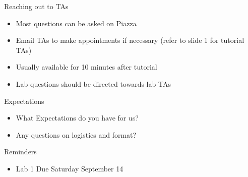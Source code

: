 \begin{frame}{Reaching out to TAs}
    \begin{itemize}
        \item Most questions can be asked on Piazza
        \item Email TAs to make appointments if necessary (refer to slide 1 for tutorial TAs)
        \item Usually available for 10 minutes after tutorial
        \item Lab questions should be directed towards lab TAs
        
    \end{itemize}
\end{frame}
\begin{frame}{Expectations}
    \begin{itemize}
        \item What Expectations do you have for us?
        \item Any questions on logistics and format?
    \end{itemize}
\end{frame}

\begin{frame}{Reminders}
    \begin{itemize}
        \item Lab 1 Due Saturday September 14
    \end{itemize}
\end{frame}





